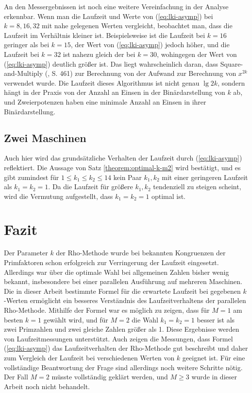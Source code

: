 \documentclass[a4paper, 11pt, ngerman]{article}
\theoremstyle{definition}
\theoremstyle{plain}
\theoremstyle{remark}
\begin{document}
An den Messergebnissen ist noch eine weitere Vereinfachung in der Analyse erkennbar. Wenn man die Laufzeit und Werte von (\ref{eq:lki-asymp}) bei $k = 8, 16, 32$ mit nahe gelegenen Werten vergleicht, beobachtet man, dass die Laufzeit im Verhältnis kleiner ist. Beispielsweise ist die Laufzeit bei $k = 16$ geringer als bei $k = 15$, der Wert von (\ref{eq:lki-asymp}) jedoch höher, und die Laufzeit bei $k = 32$ ist nahezu gleich der bei $k = 30$, wohingegen der Wert von (\ref{eq:lki-asymp}) deutlich größer ist. Das liegt wahrscheinlich daran, dass Square-and-Multiply (\cite{knu98}, S. 461) zur Berechnung von der Aufwand zur Berechnung von $x^{2k}$ verwendet wurde. Die Laufzeit dieses Algorithmus ist nicht genau $\lg 2k$, sondern hängt in der Praxis von der Anzahl an Einsen in der Binärdarstellung von $k$ ab, und Zweierpotenzen haben eine minimale Anzahl an Einsen in ihrer Binärdarstellung.

\subsection{Zwei Maschinen}

Auch hier wird das grundsätzliche Verhalten der Laufzeit durch (\ref{eq:lki-asymp}) reflektiert. Die Aussage von Satz \ref{theorem:optimal-k-m2} wird bestätigt, und es gibt zumindest für $1 \le k_1 \le k_2 \le 14$ kein Paar $k_1, k_2$ mit einer geringeren Laufzeit als $k_1 = k_2 = 1$. Da die Laufzeit für größere $k_1, k_2$ tendenziell zu steigen scheint, wird die Vermutung aufgestellt, dass $k_1 = k_2 = 1$ optimal ist.

\section{Fazit}

Der Parameter $k$ der Rho-Methode wurde bei bekannten Kongruenzen der Primfaktoren schon erfolgreich zur Verringerung der Laufzeit eingesetzt. Allerdings war über die optimale Wahl bei allgemeinen Zahlen bisher wenig bekannt, insbesondere bei einer parallelen Ausführung auf mehreren Maschinen. Die in dieser Arbeit bestimmte Formel für die erwartete Laufzeit bei gegebenen $k$-Werten ermöglicht ein besseres Verständnis des Laufzeitverhaltens der parallelen Rho-Methode. Mithilfe der Formel war es möglich zu zeigen, dass für $M = 1$ am besten $k = 1$ gewählt wird, und für $M = 2$ die Wahl $k_1 = k_2 = 1$ besser ist als zwei Primzahlen und zwei gleiche Zahlen größer als 1. Diese Ergebnisse werden von Laufzeitmessungen unterstützt. Auch zeigen die Messungen, dass Formel (\ref{eq:lki-asymp}) das Laufzeitverhalten der Rho-Methode gut beschreibt und daher zum Vergleich der Laufzeit bei verschiedenen Werten von $k$ geeignet ist. Für eine vollständige Beantwortung der Frage sind allerdings noch weitere Schritte nötig. Der Fall $M = 2$ müsste vollständig geklärt werden, und $M \ge 3$ wurde in dieser Arbeit noch nicht behandelt.
\end{document}
